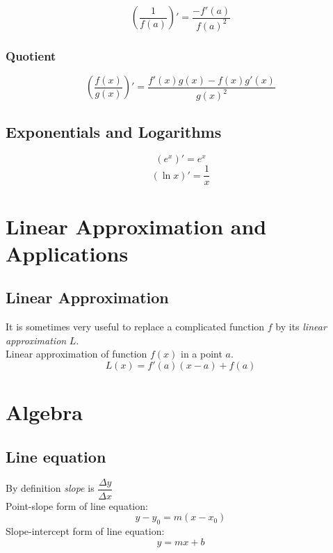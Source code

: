\documentclass[12pt, a4paper]{scrartcl}
\begin{document}
$$(\dfrac{1}{f(a)})' = \dfrac{-f'(a)}{f(a)^2}$$

\subsubsection{Quotient}
\label{sec:derivatives:computing:quotient}

$$(\dfrac{f(x)}{g(x)})'=\dfrac{f'(x)g(x) - f(x)g'(x)}{g(x)^2}$$

\subsection{Exponentials and Logarithms}
\label{sec:derivatives:exp}
$$(e^x)' = e^x$$
$$(\ln x)' = \dfrac{1}{x}$$

\section{Linear Approximation and Applications}
\label{sec:applications}

\subsection{Linear Approximation}
\label{sec:application:linear_approximation}

It is sometimes very useful to replace a complicated function $f$ by its \textit{linear approximation} $L$.\\
Linear approximation of function $f(x)$ in a point $a$.
$$L(x) = f'(a)(x-a) + f(a)$$

\newpage

\appendix

\section{Algebra}
\label{appendix:algebra}

\subsection{Line equation}
\label{appendix:algebra:line_equation}

By definition \textit{slope} is $\dfrac{\Delta y}{\Delta x}$\\
Point-slope form of line equation: $$y - y_0 = m (x - x_0)$$
Slope-intercept form of line equation: $$y = mx + b$$
\end{document}
